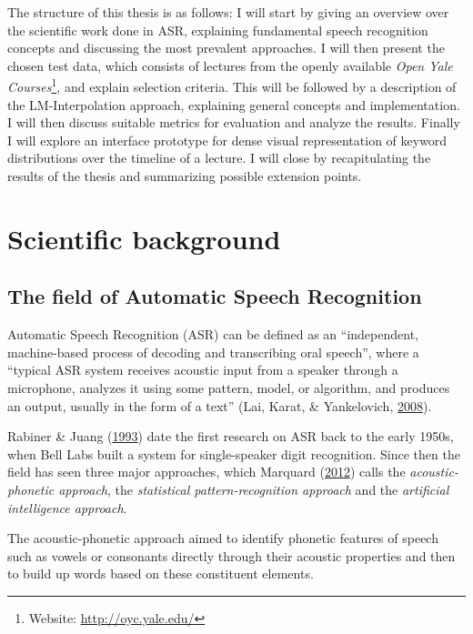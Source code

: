 \documentclass[]{article}
\begin{document}
The structure of this thesis is as follows: I will start by giving an
overview over the scientific work done in ASR, explaining fundamental
speech recognition concepts and discussing the most prevalent
approaches. I will then present the chosen test data, which consists of
lectures from the openly available \emph{Open Yale Courses}\footnote{Website:
  \url{http://oyc.yale.edu/}}, and explain selection criteria. This will
be followed by a description of the LM-Interpolation approach,
explaining general concepts and implementation. I will then discuss
suitable metrics for evaluation and analyze the results. Finally I will
explore an interface prototype for dense visual representation of
keyword distributions over the timeline of a lecture. I will close by
recapitulating the results of the thesis and summarizing possible
extension points.

\pagebreak

\section{Scientific background}\label{scientific-background}

\subsection{The field of Automatic Speech
Recognition}\label{the-field-of-automatic-speech-recognition}

Automatic Speech Recognition (ASR) can be defined as an ``independent,
machine-based process of decoding and transcribing oral speech'', where
a ``typical ASR system receives acoustic input from a speaker through a
microphone, analyzes it using some pattern, model, or algorithm, and
produces an output, usually in the form of a text'' (Lai, Karat, \&
Yankelovich, \hyperref[ref-lai]{2008}).

Rabiner \& Juang (\hyperref[ref-rabiner]{1993}) date the first research
on ASR back to the early 1950s, when Bell Labs built a system for
single-speaker digit recognition. Since then the field has seen three
major approaches, which Marquard (\hyperref[ref-marquard]{2012}) calls
the \emph{acoustic-phonetic approach}, the \emph{statistical
pattern-recognition approach} and the \emph{artificial intelligence
approach}.

The acoustic-phonetic approach aimed to identify phonetic features of
speech such as vowels or consonants directly through their acoustic
properties and then to build up words based on these constituent
elements.
\end{document}
